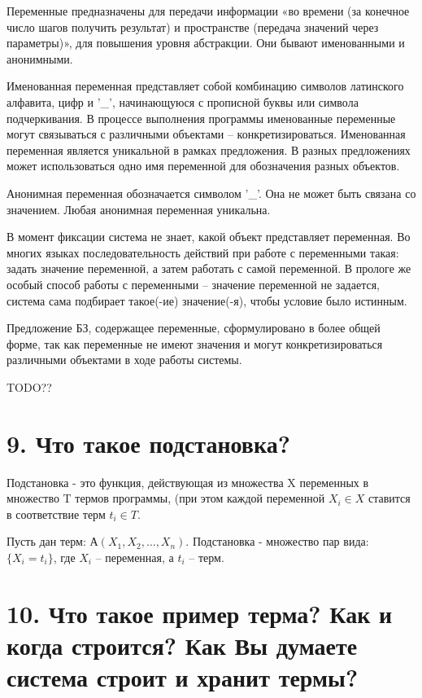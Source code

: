 \documentclass[12pt]{report}
\begin{document}
Переменные предназначены для передачи информации «во времени (за конечное число шагов получить результат) и пространстве (передача значений через параметры)», для повышения уровня абстракции. Они бывают именованными и анонимными. 

Именованная переменная представляет собой комбинацию символов латинского алфавита, цифр и ’\_’, начинающуюся с прописной буквы или символа подчеркивания. В процессе выполнения программы именованные переменные могут связываться с различными объектами – конкретизироваться. Именованная переменная является уникальной в рамках предложения. В разных предложениях может использоваться одно имя переменной для обозначения разных объектов.

Анонимная  переменная обозначается символом ’\_’. Она не может быть связана со значением. Любая анонимная переменная уникальна.



В момент фиксации система не знает, какой объект представляет переменная. Во многих языках последовательность действий при работе с переменными такая: задать значение переменной, а затем работать с самой переменной. В прологе же особый способ работы с переменными -- значение переменной не задается, система сама подбирает такое(-ие) значение(-я), чтобы условие было истинным.

Предложение БЗ, содержащее переменные, сформулировано в более общей форме, так как переменные не имеют значения и могут конкретизироваться различными объектами в ходе работы системы.




TODO??

\section*{9. Что такое подстановка?}

Подстановка - это функция, действующая из множества X переменных в множество T термов программы, (при этом каждой переменной $X_{i} \in  X$ ставится в соответствие терм $t_{i} \in  T$.



Пусть дан терм: $А(X_1, X_2,  \dots ,X_n)$.
Подстановка - множество пар вида: $\{X _ i = t _ i\}$, где $X_i$ –   переменная, а $t_i$ –  терм.


\section*{10. Что такое пример терма? Как и когда строится? Как Вы думаете система строит и хранит термы?}
\end{document}
